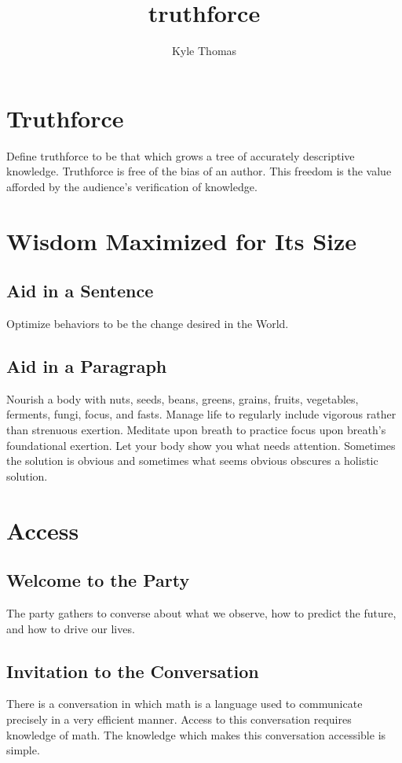 \documentclass{book}
\author{Kyle Thomas}
\title{truthforce}
\begin{document}
\tableofcontents

\section{Truthforce}
Define truthforce to be that which grows a tree of accurately descriptive knowledge.
Truthforce is free of the bias of an author.
This freedom is the value afforded by the audience's verification of knowledge.

\section{Wisdom Maximized for Its Size}
\subsection{Aid in a Sentence}
Optimize behaviors to be the change desired in the World.

\subsection{Aid in a Paragraph}
Nourish a body with nuts, seeds, beans, greens, grains, fruits, vegetables, ferments, fungi, focus, and fasts.
Manage life to regularly include vigorous rather than strenuous exertion.
Meditate upon breath to practice focus upon breath's foundational exertion.
Let your body show you what needs attention.
Sometimes the solution is obvious and sometimes what seems obvious obscures a holistic solution.

\section{Access}
\subsection{Welcome to the Party}
The party gathers to converse about what we observe, how to predict the future, and how to drive our lives.

\subsection{Invitation to the Conversation}
There is a conversation in which math is a language used to communicate precisely in a very efficient manner.
Access to this conversation requires knowledge of math.
The knowledge which makes this conversation accessible is simple.
\end{document}
